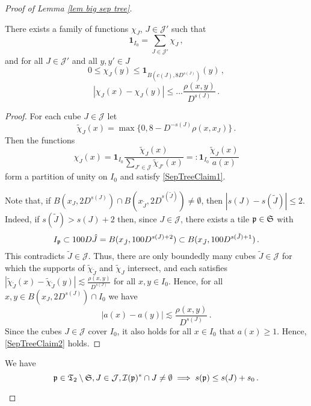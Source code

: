 \begin{proof}[Proof of Lemma \ref{lem big sep tree}]
    \begin{lemma}
        \label{lem partition of unity}
        There exists a family of functions $\chi_J$, $J \in \mathcal{J}'$ such that $$
            \mathbf{1}_{I_0} = \sum_{J \in \mathcal{J}'} \chi_J\,,
        $$
        and for all $J \in \mathcal{J}'$ and all $y,y' \in J$
        $$
            0 \leq \chi_J(y) \leq \mathbf{1}_{B(c(J), 8 D^{s(J)})}(y)\,,
        $$
        $$
            |\chi_J(x) - \chi_J(y)| \le ...  \frac{\rho(x,y)}{D^{s(J)}}\,.
        $$
    \end{lemma}
    \begin{proof}
        For each cube $J \in \mathcal{J}$ let
        $$
            \tilde\chi_J(x) = \max\{0, 8 - D^{-s(J)} \rho(x, x_J)\}\,.
        $$
        Then the functions
        \[
            \chi_J(x) = \mathbf{1}_{I_0} \frac{\tilde \chi_J(x)}{\sum_{J' \in \mathcal{J}} \tilde \chi_{J'}(x)}=: \mathbf{1}_{I_0} \frac{\tilde \chi_J(x)}{a(x)}
        \]
        form a partition of unity on $I_0$ and satisfy \ref{SepTreeClaim1}.

        Note that, if $B(x_J, 2D^{s(J)}) \cap B(x_{\tilde J}, 2D^{s(\tilde J)}) \neq \emptyset$, then $|s(J) - s(\tilde J)| \leq 2$. Indeed, if $s(\tilde J) > s(J) + 2$ then, since $J \in \mathcal{J}$, there exists a tile $\mathfrak p \in \mathfrak{S}$ with
        $$
        I_{\mathfrak p} \subset 100 D \hat{J} = B(x_{\hat J}, 100 D^{s(J) + 2}) \subset B(x_{\tilde J}, 100 D^{s(\tilde J) + 1})\,.
        $$
        This contradicts $\tilde J \in \mathcal{J}$. Thus, there are only boundedly many cubes $\tilde J \in \mathcal{J}$ for which the supports of $\tilde \chi_{\tilde J}$ and $\tilde \chi_J$ intersect, and each satisfies $|\tilde \chi_{\tilde J}(x) - \tilde \chi_{\tilde J}(y)| \lesssim  \frac{\rho(x,y)}{D^{s(J)}}$ for all $x, y \in I_0$. Hence, for all $x, y \in B(x_J, 2 D^{s(J)}) \cap I_0$ we have
        $$
            |a(x) - a(y)| \lesssim \frac{\rho(x,y)}{D^{s(J)}}\,.
        $$
        Since the cubes $J \in \mathcal{J}$ cover $I_0$, it also holds for all $x \in I_0$ that $a(x) \geq 1$. Hence, \ref{SepTreeClaim2} holds. \qedsymbol
    \end{proof}



    \begin{lemma}
        \label{lem sep tree aux 2}
        We have 
        \begin{equation}
            \mathfrak p \in \mathfrak{T}_2 \setminus \mathfrak{S}, J \in \mathcal{J}, \mathcal{I}(\mathfrak p)^* \cap J \neq \emptyset \implies s(\mathfrak p) \leq s(J) + s_0\,.
        \end{equation}
    \end{lemma}


\end{proof}
